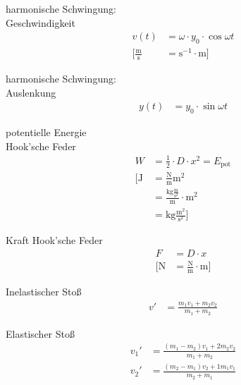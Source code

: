 \begin{karte}{harmonische Schwingung:\\Geschwindigkeit}
    \begin{align*}
        v(t) &= \omega \cdot y_0 \cdot \cos \omega t \\
        \bigg[ \frac{\text{m}}{\text{s}} &= \text{s}^{-1} \cdot \text{m} \bigg]
    \end{align*}
\end{karte}

\begin{karte}{harmonische Schwingung:\\Auslenkung}
    \begin{align*}
        y(t) &= y_0 \cdot \sin \omega t
    \end{align*}
\end{karte}

\begin{karte}{potentielle Energie\\Hook'sche Feder}
    \begin{align*}
        W &= \frac{1}{2}\cdot D\cdot x^2 = E_\text{pot} \\
        \bigg[ \text{J} &= \frac{\text{N}}{\text{m}} \text{m}^2 \\
        &= \frac{\text{kg}\frac{\text{m}}{\text{s}^2}}{\text{m}} \cdot \text{m}^2 \\
        &= \text{kg}\frac{\text{m}^2}{\text{s}^2} \bigg]
    \end{align*}
\end{karte}

\begin{karte}{Kraft Hook'sche Feder}
    \begin{align*}
        F &= D \cdot x \\
        \bigg[ \text{N} &= \frac{\text{N}}{\text{m}} \cdot \text{m} \bigg]
    \end{align*}
\end{karte}

\begin{karte}{Inelastischer Stoß}
    \begin{align*}
        v' &= \frac{ m_1v_1+m_2v_2}{m_1+m_2}
    \end{align*}
\end{karte}

\begin{karte}{Elastischer Stoß}
    \begin{align*}
        v_1'&= \frac{(m_1-m_2)v_1 + 2m_2v_2}{m_1+m_2} \\
        v_2'&= \frac{(m_2-m_1)v_2 + 1m_1v_1}{m_2+m_1}
    \end{align*}
\end{karte}

